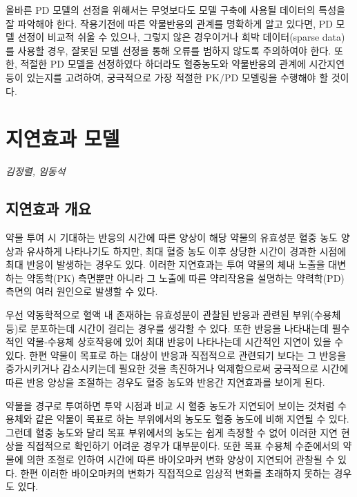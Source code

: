 \documentclass[
  10pt,
  krantz2,
  a4paper]{krantz}
\theoremstyle{definition}
\theoremstyle{definition}
\theoremstyle{definition}
\theoremstyle{remark}
\begin{document}
올바른 PD 모델의 선정을 위해서는 무엇보다도 모델 구축에 사용될 데이터의 특성을 잘 파악해야 한다. 작용기전에 따른 약물반응의 관계를 명확하게 알고 있다면, PD 모델 선정이 비교적 쉬울 수 있으나, 그렇지 않은 경우이거나 희박 데이터(sparse data)를 사용할 경우, 잘못된 모델 선정을 통해 오류를 범하지 않도록 주의하여야 한다. 또한, 적절한 PD 모델을 선정하였다 하더라도 혈중농도와 약물반응의 관계에 시간지연 등이 있는지를 고려하여, 궁극적으로 가장 적절한 PK/PD 모델링을 수행해야 할 것이다.

\hypertarget{delayed-effect}{%
\chapter{지연효과 모델}\label{delayed-effect}}

\emph{김정렬, 임동석}

\hypertarget{uxc9c0uxc5f0uxd6a8uxacfc-uxac1cuxc694}{%
\section{지연효과 개요}\label{uxc9c0uxc5f0uxd6a8uxacfc-uxac1cuxc694}}

약물 투여 시 기대하는 반응의 시간에 따른 양상이 해당 약물의 유효성분 혈중 농도 양상과 유사하게 나타나기도 하지만, 최대 혈중 농도 이후 상당한 시간이 경과한 시점에 최대 반응이 발생하는 경우도 있다. 이러한 지연효과는 투여 약물의 체내 노출을 대변하는 약동학(PK) 측면뿐만 아니라 그 노출에 따른 약리작용을 설명하는 약력학(PD) 측면의 여러 원인으로 발생할 수 있다.

우선 약동학적으로 혈액 내 존재하는 유효성분이 관찰된 반응과 관련된 부위(수용체 등)로 분포하는데 시간이 걸리는 경우를 생각할 수 있다. 또한 반응을 나타내는데 필수적인 약물-수용체 상호작용에 있어 최대 반응이 나타나는데 시간적인 지연이 있을 수 있다. 한편 약물이 목표로 하는 대상이 반응과 직접적으로 관련되기 보다는 그 반응을 증가시키거나 감소시키는데 필요한 것을 촉진하거나 억제함으로써 궁극적으로 시간에 따른 반응 양상을 조절하는 경우도 혈중 농도와 반응간 지연효과를 보이게 된다.

약물을 경구로 투여하면 투약 시점과 비교 시 혈중 농도가 지연되어 보이는 것처럼 수용체와 같은 약물이 목표로 하는 부위에서의 농도도 혈중 농도에 비해 지연될 수 있다. 그런데 혈중 농도와 달리 목표 부위에서의 농도는 쉽게 측정할 수 없어 이러한 지연 현상을 직접적으로 확인하기 어려운 경우가 대부분이다. 또한 목표 수용체 수준에서의 약물에 의한 조절로 인하여 시간에 따른 바이오마커 변화 양상이 지연되어 관찰될 수 있다. 한편 이러한 바이오마커의 변화가 직접적으로 임상적 변화를 초래하지 못하는 경우도 있다.
\end{document}

